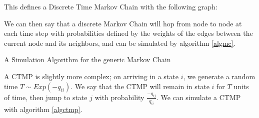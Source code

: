 This defines a Discrete Time Markov Chain with the following graph:



We can then say that a discrete Markov Chain will hop from node to node at each time step with probabilities defined by the weights of the edges between the current node and its neighbors, and can be simulated by algorithm \ref{algmc}.

\begin{algorithm}
\SetAlgoLined
{}

\caption{A Simulation Algorithm for the generic Markov Chain}\label{algmc}

\end{algorithm}

A CTMP is slightly more complex; on arriving in a state $i$, we generate a random time $T \sim Exp(-q_{ii})$. We say that the CTMP will remain in state $i$ for $T$ units of time, then jump to state $j$ with probability $\frac{-q_{ij}}{q_{ii}}$. We can simulate a CTMP with algorithm \ref{algctmp}.

